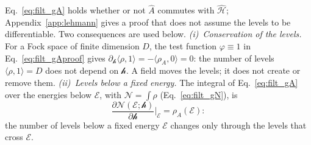 \documentclass[10pt,a4paper]{article}
\theoremstyle{plain}
\newcommand{\cN}{\mathcal{N}}   %
\newcommand{\hfield}{\mathscr{h}}  %
\newcommand{\enrg}{\mathcal{E}}  %
\begin{document}
\begin{itemize}
  Eq.~\eqref{eq:filt_gA} holds whether or not $\hat A$ commutes with
  $\hat{\mathcal H}$; Appendix~\ref{app:lehmann} gives a proof that does not
  assume the levels to be differentiable. Two consequences are used below.
  \emph{(i)~Conservation of the levels.} For a Fock space of finite dimension
  $D$, the test function $\varphi\equiv1$ in Eq.~\eqref{eq:filt_gAproof}
  gives $\partial_\hfield\langle\rho,1\rangle=-\langle\rho_A,0\rangle=0$: the
  number of levels $\langle\rho,1\rangle=D$ does not depend on $\hfield$. A
  field moves the levels; it does not create or remove them.
  \emph{(ii)~Levels below a fixed energy.} The integral of
  Eq.~\eqref{eq:filt_gA} over the energies below $\enrg$, with
  $\cN=\int\rho$ (Eq.~\eqref{eq:filt_gN}), is
  \begin{equation}\label{eq:filt_NA}
    \frac{\partial\cN(\enrg;\hfield)}{\partial\hfield}\bigg|_{\enrg}=\rho_A(\enrg) :
  \end{equation}
  the number of levels below a fixed energy $\enrg$ changes only through the
  levels that cross $\enrg$.
\end{itemize}
\end{document}
